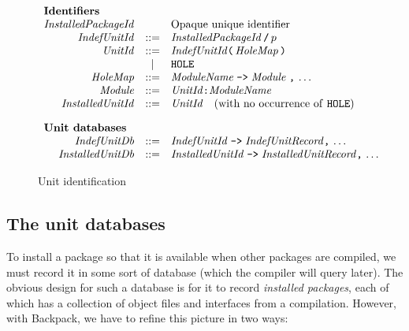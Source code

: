 \documentclass{article}
\newcommand{\I}[1]{\ensuremath{\mathit{#1}}}
\begin{document}
\begin{figure}[htpb]
$$
\begin{array}{rcll}
\multicolumn{3}{l}{\mbox{\bf Identifiers}} \\
  \I{InstalledPackageId} &  & \mbox{Opaque unique identifier} \\
  \I{IndefUnitId} & ::= & \I{InstalledPackageId}\, \verb|/|\, p  \\
  \I{UnitId} & ::= & \I{IndefUnitId} \verb|(|\, \I{HoleMap}\, \verb|)|  \\
              & | & \verb|HOLE| \\
  \I{HoleMap} & ::= & \I{ModuleName}\; \verb|->|\; \I{Module}\; \verb|,|\, \ldots \\
  \I{Module} & ::= & \I{UnitId} \verb|:| \I{ModuleName}  \\
  \I{InstalledUnitId} & ::= & \I{UnitId} \quad \mbox{(with no occurrence of \texttt{HOLE})} \\[1em]
\multicolumn{3}{l}{\mbox{\bf Unit databases}} \\
  \I{IndefUnitDb} & ::= & \I{IndefUnitId} \; \verb|->| \; \I{IndefUnitRecord} \verb|,|\, \ldots \\
  \I{InstalledUnitDb} & ::= & \I{InstalledUnitId} \; \verb|->| \; \I{InstalledUnitRecord} \verb|,|\, \ldots \\
\end{array}
$$
\caption{Unit identification} \label{fig:ids}
\end{figure}

\subsection{The unit databases}

To install a package so that it is available when other packages are compiled,
we must record it in some sort of database (which the compiler will query later).
The obvious design for such a database is for it to record \emph{installed packages},
each of which has a collection of object files and interfaces from a compilation.
However, with Backpack, we have to refine this picture in two ways:
\end{document}
